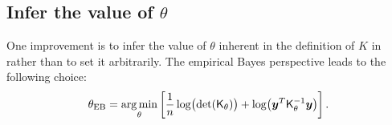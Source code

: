 \documentclass[]{mcom-l}
\theoremstyle{remark}
\DeclareMathOperator*{\argmin}{arg\,min}
\newcommand{\mK}{\mathsf{K}}
\newcommand{\by}{{\boldsymbol{y}}}
\begin{document}
\subsection{ Infer the value of $\theta$}

One improvement is to infer the value of $\theta$ inherent in the definition of $K$ in rather than to set it arbitrarily. The empirical Bayes perspective leads to the following choice: 
\begin{equation} \label{eq:thetEB}
\theta_{\textup{EB}} = \argmin_\theta \left[\frac 1n \log \bigl( \det(\mK_\theta) \bigr) + \log \bigl ( \by^T \mK_\theta^{-1} \by \bigr)\right].
\end{equation}






\end{document}
